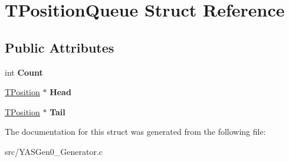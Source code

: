 \hypertarget{struct_t_position_queue}{}\section{T\+Position\+Queue Struct Reference}
\label{struct_t_position_queue}
\subsection*{Public Attributes}
\begin{DoxyCompactItemize}
\item 
\mbox{\label{struct_t_position_queue_a634af41b0add3bdca2da5d2c4c312b2d}} 
int {\bfseries Count}
\item 
\mbox{\label{struct_t_position_queue_adf6473314e7544d4a57dbef5068330e2}} 
\hyperlink{struct_t_position}{T\+Position} $\ast$ {\bfseries Head}
\item 
\mbox{\label{struct_t_position_queue_a6017a8823573246c36995152a14f780c}} 
\hyperlink{struct_t_position}{T\+Position} $\ast$ {\bfseries Tail}
\end{DoxyCompactItemize}


The documentation for this struct was generated from the following file\+:\begin{DoxyCompactItemize}
\item 
src/Y\+A\+S\+Gen0\+\_\+\+Generator.\+c\end{DoxyCompactItemize}
